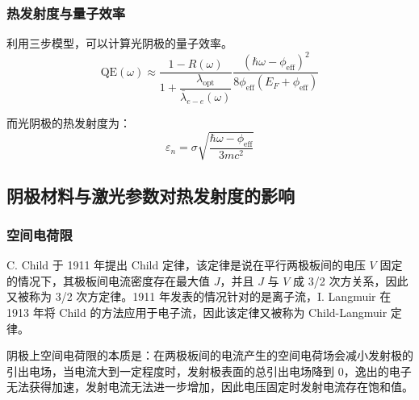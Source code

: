 \subsubsection{热发射度与量子效率}
利用三步模型，可以计算光阴极的量子效率。
	\begin{equation}
	\mathrm{QE}(\omega) \approx\dfrac{1-R(\omega)}{1+\dfrac{\lambda_{\mathrm{opt}}}{\bar{\lambda}_{e-e}(\omega)}}\frac{(\hbar\omega-\phi_{\mathrm{eff}})^2}{8\phi_{\mathrm{eff}}(E_F+\phi_{\mathrm{eff}})}
	\end{equation}
	
而光阴极的热发射度为：
	\begin{equation}
	\varepsilon_{n} =\sigma\sqrt{\dfrac{\hbar\omega-\phi_{\mathrm{eff}}}{3mc^2}}
	\end{equation}
\subsection{阴极材料与激光参数对热发射度的影响}
\subsubsection{空间电荷限}
	C. Child 于 1911 年提出 Child 定律，该定律是说在平行两极板间的电压 $V$ 固定的情况下，其极板间电流密度存在最大值 $J$，并且 $J$ 与 $V$ 成 3/2 次方关系，因此又被称为 3/2 次方定律。1911 年发表的情况针对的是离子流，I. Langmuir 在 1913 年将 Child 的方法应用于电子流，因此该定律又被称为 Child-Langmuir 定律。

	阴极上空间电荷限的本质是：在两极板间的电流产生的空间电荷场会减小发射极的引出电场，当电流大到一定程度时，发射极表面的总引出电场降到 0，逸出的电子无法获得加速，发射电流无法进一步增加，因此电压固定时发射电流存在饱和值。
	
